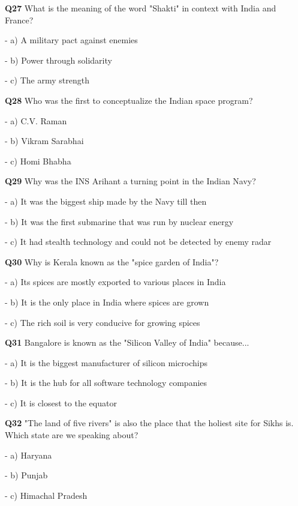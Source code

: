 \textbf{Q27} What is the meaning of the word "Shakti" in context with India and France?\par
\quad - a) A military pact against enemies\par
\quad - b) Power through solidarity\par
\quad - c) The army strength\par

\textbf{Q28} Who was the first to conceptualize the Indian space program?\par
\quad - a) C.V. Raman\par
\quad - b) Vikram Sarabhai\par
\quad - c) Homi Bhabha\par

\textbf{Q29} Why was the INS Arihant a turning point in the Indian Navy?\par
\quad - a) It was the biggest ship made by the Navy till then\par
\quad - b) It was the first submarine that was run by nuclear energy\par
\quad - c) It had stealth technology and could not be detected by enemy radar\par

\textbf{Q30} Why is Kerala known as the "spice garden of India"?\par
\quad - a) Its spices are mostly exported to various places in India\par
\quad - b) It is the only place in India where spices are grown\par
\quad - c) The rich soil is very conducive for growing spices\par

\textbf{Q31} Bangalore is known as the "Silicon Valley of India" because...\par
\quad - a) It is the biggest manufacturer of silicon microchips\par
\quad - b) It is the hub for all software technology companies\par
\quad - c) It is closest to the equator\par

\textbf{Q32} "The land of five rivers" is also the place that the holiest site for Sikhs is. Which state are we speaking about?\par
\quad - a) Haryana\par
\quad - b) Punjab\par
\quad - c) Himachal Pradesh\par


